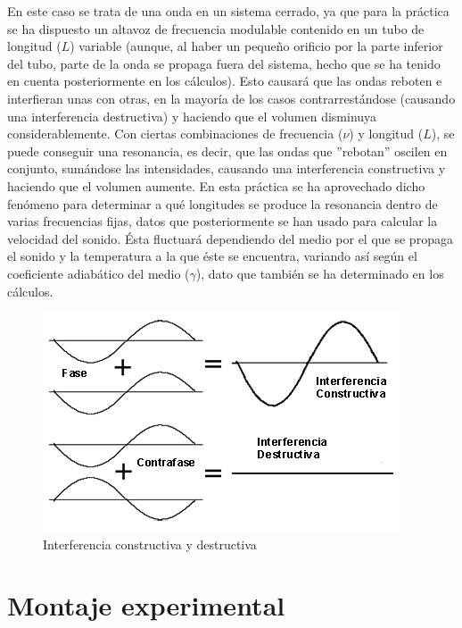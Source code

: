 \documentclass[fleqn,usenatbib,openbib]{mnras}
\begin{document}
En este caso se trata de una onda en un sistema cerrado, ya que para la práctica se ha dispuesto un altavoz de frecuencia modulable contenido en un tubo de longitud ($L$) variable (aunque, al haber un pequeño orificio por la parte inferior del tubo, parte de la onda se propaga fuera del sistema, hecho que se ha tenido en cuenta posteriormente en los cálculos). Esto causará que las ondas reboten e interfieran unas con otras, en la mayoría de los casos contrarrestándose (causando una interferencia destructiva) y haciendo que el volumen disminuya considerablemente. Con ciertas combinaciones de frecuencia ($\nu$) y longitud ($L$), se puede conseguir una resonancia, es decir, que las ondas que ''rebotan'' oscilen en conjunto, sumándose las intensidades, causando una interferencia constructiva \cite{hund} y haciendo que el volumen aumente. En esta práctica se ha aprovechado dicho fenómeno para determinar a qué longitudes se produce la resonancia dentro de varias frecuencias fijas, datos que posteriormente se han usado para calcular la velocidad del sonido. Ésta fluctuará dependiendo del medio por el que se propaga el sonido y la temperatura a la que éste se encuentra, variando así según el coeficiente adiabático del medio ($\gamma$), dato que también se ha determinado en los cálculos.

\begin{figure}
    \centering
    \includegraphics[width=\columnwidth]{interferencia.png}
    \caption{Interferencia constructiva y destructiva \protect\cite{img}}
    \label{fig:interferencia}
    \end{figure}

\section{Montaje experimental}
\end{document}
